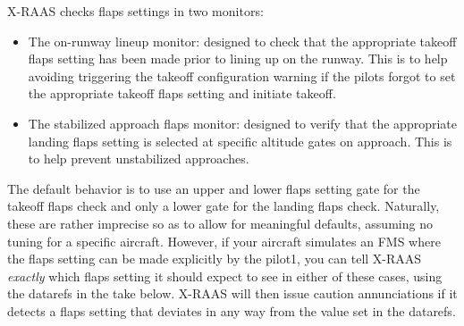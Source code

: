 \documentclass[a4paper,12pt]{article}
\begin{document}
X-RAAS checks flaps settings in two monitors:

\begin{itemize}

\item The on-runway lineup monitor: designed to check that the
appropriate takeoff flaps setting has been made prior to lining up on the
runway. This is to help avoiding triggering the takeoff configuration
warning if the pilots forgot to set the appropriate takeoff flaps setting
and initiate takeoff.

\item The stabilized approach flaps monitor: designed to verify that the
appropriate landing flaps setting is selected at specific altitude gates
on approach. This is to help prevent unstabilized approaches.

\end{itemize}

\noindent The default behavior is to use an upper and lower flaps setting
gate for the takeoff flaps check and only a lower gate for the landing
flaps check. Naturally, these are rather imprecise so as to allow for
meaningful defaults, assuming no tuning for a specific aircraft. However,
if your aircraft simulates an FMS where the flaps setting can be made
explicitly by the pilot1, you can tell X-RAAS \emph{exactly} which flaps
setting it should expect to see in either of these cases, using the
datarefs in the take below. X-RAAS will then issue caution annunciations
if it detects a flaps setting that deviates in any way from the value set
in the datarefs.
\end{document}
